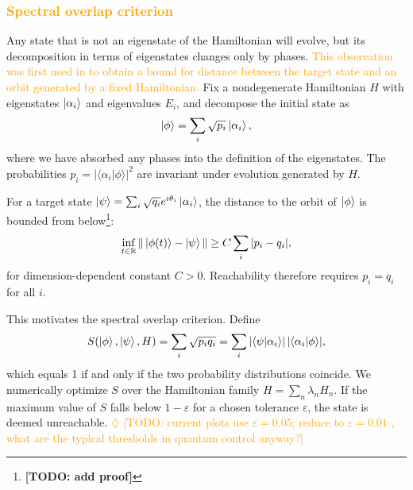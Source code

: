 \documentclass[aps,prx,reprint,superscriptaddress,footnote, twocolumn,notitlepage]{revtex4-2}
\newcommand{\ko}[1]{\textcolor{orange}{#1}}
\newcommand{\todoko}[1]{\ko{$\diamondsuit$ #1}}
\begin{document}

\subsubsection{\ko{Spectral overlap criterion}}
Any state that is not an eigenstate of the Hamiltonian will evolve, but its decomposition in terms of eigenstates changes only by phases. \ko{This observation was first used in \cite{schirmer_design_2018} to obtain a bound for distance between the target state and an orbit generated by a fixed Hamiltonian.}
Fix a nondegenerate Hamiltonian $H$ with eigenstates $\ket{\alpha_i}$ and eigenvalues $E_i$, and decompose the initial state as
\begin{equation}
    \ket{\phi} = \sum_i \sqrt{p_i} \ket{\alpha_i},
\end{equation}
where we have absorbed any phases into the definition of the eigenstates. The probabilities $p_i = |\langle \alpha_i | \phi \rangle|^2$ are invariant under evolution generated by $H$.

For a target state $\ket{\psi} = \sum_i \sqrt{q_i} e^{i\theta_i} \ket{\alpha_i}$, the distance to the orbit of $\ket{\phi}$ is bounded from below\footnote{\textbf{[TODO: add proof]}}:
\begin{equation}
    \inf_{t \in \mathbb{R}} \| \ket{\phi(t)} - \ket{\psi} \| \geq C \sum_i |p_i - q_i|,
\end{equation}
for dimension-dependent constant $C > 0$. Reachability therefore requires $p_i = q_i$ for all $i$.

This motivates the spectral overlap criterion. Define
\begin{equation}
    S(\ket{\phi}, \ket{\psi}, H) = \sum_i \sqrt{p_i q_i} = \sum_i |\langle \psi | \alpha_i \rangle| \, |\langle \alpha_i | \phi \rangle|,
\end{equation}
which equals 1 if and only if the two probability distributions coincide. We numerically optimize $S$ over the Hamiltonian family $H = \sum_n \lambda_n H_n$. If the maximum value of $S$ falls below $1 - \varepsilon$ for a chosen tolerance $\varepsilon$, the state is deemed unreachable. \todoko{[TODO: current plots use $\varepsilon = 0.05$; reduce to $\varepsilon = 0.01$ , what are the typical thresholds in quantum control anyway?]}
\end{document}
